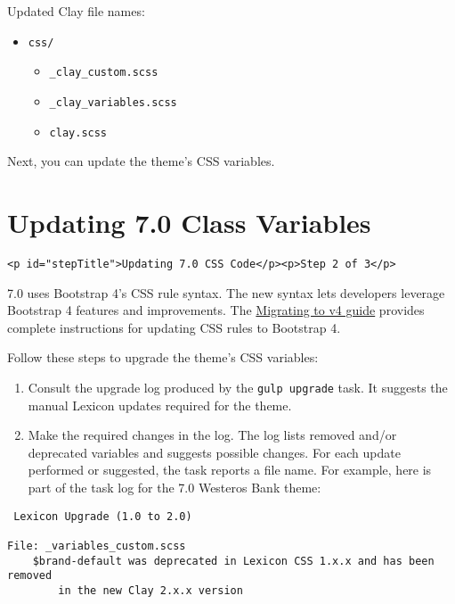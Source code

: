 Updated Clay file names:

\begin{itemize}
\tightlist
\item
  \texttt{css/}

  \begin{itemize}
  \tightlist
  \item
    \texttt{\_clay\_custom.scss}
  \item
    \texttt{\_clay\_variables.scss}
  \item
    \texttt{clay.scss}
  \end{itemize}
\end{itemize}

Next, you can update the theme's CSS variables.

\chapter{Updating 7.0 Class
Variables}\label{updating-7.0-class-variables}

\begin{verbatim}
<p id="stepTitle">Updating 7.0 CSS Code</p><p>Step 2 of 3</p>
\end{verbatim}

7.0 uses Bootstrap 4's CSS rule syntax. The new syntax lets developers
leverage Bootstrap 4 features and improvements. The
\href{https://getbootstrap.com/docs/4.0/migration/}{Migrating to v4
guide} provides complete instructions for updating CSS rules to
Bootstrap 4.

Follow these steps to upgrade the theme's CSS variables:

\begin{enumerate}
\def\labelenumi{\arabic{enumi}.}
\item
  Consult the upgrade log produced by the \texttt{gulp\ upgrade} task.
  It suggests the manual Lexicon updates required for the theme.
\item
  Make the required changes in the log. The log lists removed and/or
  deprecated variables and suggests possible changes. For each update
  performed or suggested, the task reports a file name. For example,
  here is part of the task log for the 7.0 Westeros Bank theme:
\end{enumerate}

\begin{verbatim}
 Lexicon Upgrade (1.0 to 2.0)

File: _variables_custom.scss
    $brand-default was deprecated in Lexicon CSS 1.x.x and has been removed 
        in the new Clay 2.x.x version
\end{verbatim}

